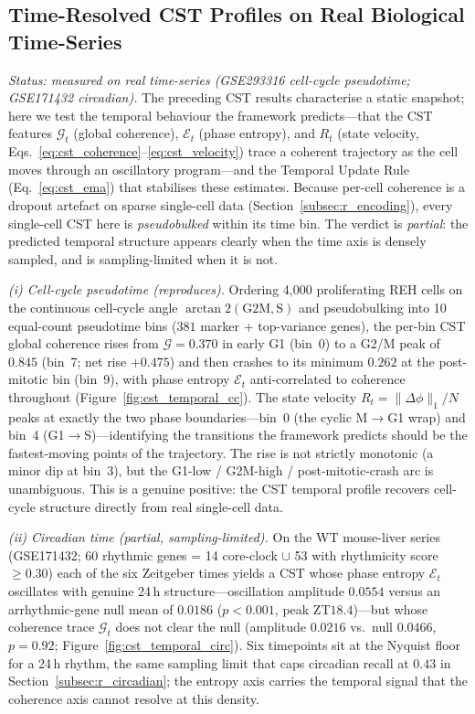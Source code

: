 \documentclass[preprint,12pt,amsmath,amssymb,superscriptaddress,floatfix]{revtex4-2}
\begin{document}
\subsection{Time-Resolved CST Profiles on Real Biological Time-Series}
\label{subsec:r_cst_temporal}

\emph{Status: measured on real time-series (GSE293316 cell-cycle pseudotime;
GSE171432 circadian).} The preceding CST results characterise a static
snapshot; here we test the temporal behaviour the framework predicts---that the
CST features $\mathcal{G}_t$ (global coherence), $\mathcal{E}_t$ (phase
entropy), and $R_t$ (state velocity, Eqs.~\ref{eq:cst_coherence}--\ref{eq:cst_velocity})
trace a coherent trajectory as the cell moves through an oscillatory
program---and the Temporal Update Rule (Eq.~\ref{eq:cst_ema}) that stabilises
these estimates. Because per-cell coherence is a dropout artefact on sparse
single-cell data (Section~\ref{subsec:r_encoding}), every single-cell CST here
is \emph{pseudobulked} within its time bin. The verdict is \emph{partial}: the
predicted temporal structure appears clearly when the time axis is densely
sampled, and is sampling-limited when it is not.

\emph{(i) Cell-cycle pseudotime (reproduces).} Ordering 4{,}000 proliferating
REH cells on the continuous cell-cycle angle $\arctan2(\mathrm{G2M},\mathrm{S})$
and pseudobulking into 10 equal-count pseudotime bins ($381$ marker + top-variance
genes), the per-bin CST global coherence rises from $\mathcal{G}=0.370$ in early
G1 (bin~0) to a G2/M peak of $0.845$ (bin~7; net rise $+0.475$) and then crashes
to its minimum $0.262$ at the post-mitotic bin (bin~9), with phase entropy
$\mathcal{E}_t$ anti-correlated to coherence throughout
(Figure~\ref{fig:cst_temporal_cc}). The state velocity $R_t=\|\Delta\phi\|_1/N$
peaks at exactly the two phase boundaries---bin~0 (the cyclic M$\to$G1 wrap) and
bin~4 (G1$\to$S)---identifying the transitions the framework predicts should be
the fastest-moving points of the trajectory. The rise is not strictly monotonic
(a minor dip at bin~3), but the G1-low / G2M-high / post-mitotic-crash arc is
unambiguous. This is a genuine positive: the CST temporal profile recovers
cell-cycle structure directly from real single-cell data.

\emph{(ii) Circadian time (partial, sampling-limited).} On the WT mouse-liver
series (GSE171432; 60 rhythmic genes = 14 core-clock $\cup$ 53 with rhythmicity
score $\ge0.30$) each of the six Zeitgeber times yields a CST whose phase
entropy $\mathcal{E}_t$ oscillates with genuine 24\,h structure---oscillation
amplitude $0.0554$ versus an arrhythmic-gene null mean of $0.0186$
($p<0.001$, peak ZT$18.4$)---but whose coherence trace $\mathcal{G}_t$ does not
clear the null (amplitude $0.0216$ vs.\ null $0.0466$, $p=0.92$;
Figure~\ref{fig:cst_temporal_circ}). Six timepoints sit at the Nyquist floor for
a 24\,h rhythm, the same sampling limit that caps circadian recall at $0.43$ in
Section~\ref{subsec:r_circadian}; the entropy axis carries the temporal signal
that the coherence axis cannot resolve at this density.
\end{document}
